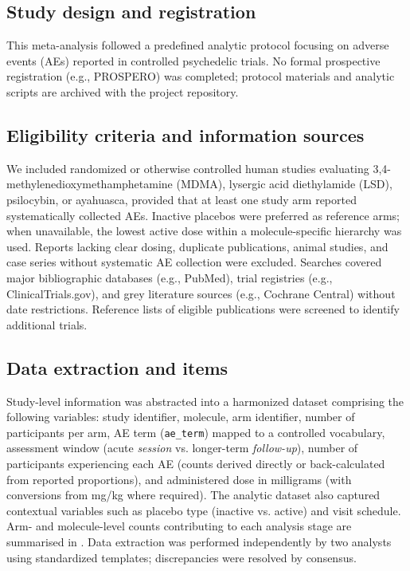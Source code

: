 \subsection{Study design and registration}
This meta-analysis followed a predefined analytic protocol focusing on adverse events (AEs) reported in controlled psychedelic trials. No formal prospective registration (e.g., PROSPERO) was completed; protocol materials and analytic scripts are archived with the project repository.

\subsection{Eligibility criteria and information sources}
We included randomized or otherwise controlled human studies evaluating 3,4-methylenedioxymethamphetamine (MDMA), lysergic acid diethylamide (LSD), psilocybin, or ayahuasca, provided that at least one study arm reported systematically collected AEs. Inactive placebos were preferred as reference arms; when unavailable, the lowest active dose within a molecule-specific hierarchy was used. Reports lacking clear dosing, duplicate publications, animal studies, and case series without systematic AE collection were excluded. Searches covered major bibliographic databases (e.g., PubMed), trial registries (e.g., ClinicalTrials.gov), and grey literature sources (e.g., Cochrane Central) without date restrictions. Reference lists of eligible publications were screened to identify additional trials.

\subsection{Data extraction and items}
Study-level information was abstracted into a harmonized dataset comprising the following variables: study identifier, molecule, arm identifier, number of participants per arm, AE term (\texttt{ae\_term}) mapped to a controlled vocabulary, assessment window (acute \emph{session} vs. longer-term \emph{follow-up}), number of participants experiencing each AE (counts derived directly or back-calculated from reported proportions), and administered dose in milligrams (with conversions from mg/kg where required). The analytic dataset also captured contextual variables such as placebo type (inactive vs. active) and visit schedule. Arm- and molecule-level counts contributing to each analysis stage are summarised in . Data extraction was performed independently by two analysts using standardized templates; discrepancies were resolved by consensus.

